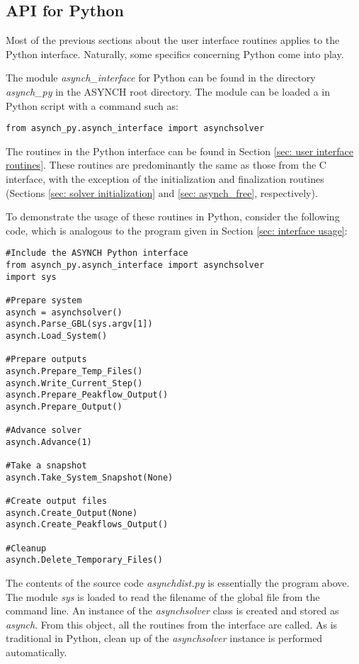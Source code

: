 \documentclass[12pt]{article}
\begin{document}
\subsection{API for Python} \label{sec: api for python}

Most of the previous sections about the user interface routines applies to the Python interface. Naturally, some specifics concerning Python come into play.

The module \emph{asynch\_interface} for Python can be found in the directory \emph{asynch\_py} in the ASYNCH root directory. The module can be loaded a in Python script with a command such as:
\begin{lstlisting}[style=PythonStyle]
from asynch_py.asynch_interface import asynchsolver
\end{lstlisting}
The routines in the Python interface can be found in Section \ref{sec: user interface routines}. These routines are predominantly the same as those from the C interface, with the exception of the initialization and finalization routines (Sections \ref{sec: solver initialization} and \ref{sec: asynch_free}, respectively).

To demonstrate the usage of these routines in Python, consider the following code, which is analogous to the program given in Section \ref{sec: interface usage}:
\begin{lstlisting}[style=PythonStyle]
#Include the ASYNCH Python interface
from asynch_py.asynch_interface import asynchsolver
import sys

#Prepare system
asynch = asynchsolver()
asynch.Parse_GBL(sys.argv[1])
asynch.Load_System()

#Prepare outputs
asynch.Prepare_Temp_Files()
asynch.Write_Current_Step()
asynch.Prepare_Peakflow_Output()
asynch.Prepare_Output()

#Advance solver
asynch.Advance(1)

#Take a snapshot
asynch.Take_System_Snapshot(None)

#Create output files
asynch.Create_Output(None)
asynch.Create_Peakflows_Output()

#Cleanup
asynch.Delete_Temporary_Files()
\end{lstlisting}
The contents of the source code \emph{asynchdist.py} is essentially the program above. The module \emph{sys} is loaded to read the filename of the global file from the command line. An instance of the \emph{asynchsolver} class is created and stored as \emph{asynch}. From this object, all the routines from the interface are called. As is traditional in Python, clean up of the \emph{asynchsolver} instance is performed automatically.
\end{document}

